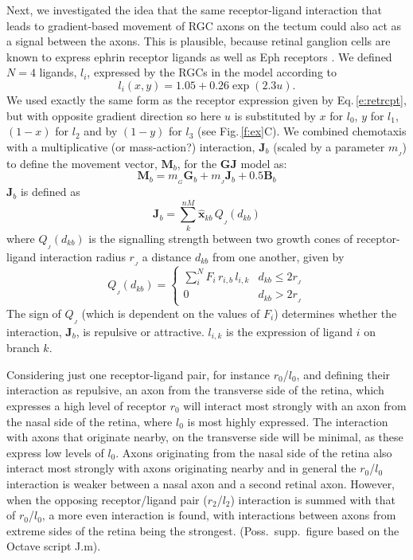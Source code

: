 \documentclass[11pt, a4paper]{article}
\begin{document}
Next, we investigated the idea that the same receptor-ligand
interaction that leads to gradient-based movement of RGC axons on the tectum
could also act as a signal between the axons. This is plausible, because
retinal ganglion cells are known to express ephrin receptor ligands as well as
Eph receptors \citep{ephrins_on_RGCs}. We defined $N=4$ ligands, $l_i$,
expressed by the RGCs in the model according to
%
\begin{equation} \label{e:retlig}
l_i(x,y) = 1.05 + 0.26 \exp(2.3 u).
\end{equation}
%
We used exactly the same form as the receptor expression given by
Eq.\,\ref{e:retrcpt}, but with opposite gradient direction so here $u$ is
substituted by $x$ for $l_0$, $y$ for $l_1$, $(1-x)$ for $l_2$ and by $(1-y)$
for $l_3$ (see Fig.\,\ref{f:ex}C).
%
We combined chemotaxis with a multiplicative (or mass-action?) interaction,
$\mathbf{J}_b$ (scaled by a parameter $m_{\!_J}$) to define the movement
vector, $\mathbf{M}_b$, for the $\mathbf{GJ}$ model as:
%
\begin{equation} \label{e:mv3}
 \mathbf{M}_{b} = m_{\!_G} \mathbf{G}_b + m_{\!_J} \mathbf{J}_b + 0.5 \mathbf{B}_b
\end{equation}
%
$\mathbf{J}_b$ is defined as
%
\begin{equation}
\mathbf{J}_b = \sum_k^{nM} \hat{\mathbf{x}}_{kb}\,Q_{\!_J}(d_{kb})
\end{equation}
%
where $Q_{\!_J}(d_{kb})$ is the signalling strength between two growth cones of
receptor-ligand interaction radius $r_{\!_J}$ a distance $d_{kb}$ from one another,
given by
%
\begin{equation}
Q_{\!_J}(d_{kb}) = \begin{cases}
     \sum_i^N F_i\,r_{i,b}\,l_{i,k}    & d_{kb} \leq 2r_{\!_J} \\
     0 & d_{kb} > 2r_{\!_J}
     \end{cases}
\end{equation}
%
The sign of $Q_{\!_J}$ (which is dependent on the values of $F_i$) determines
whether the interaction, $\mathbf{J}_b$, is repulsive or attractive. $l_{i,k}$
is the expression of ligand $i$ on branch $k$.

Considering just one receptor-ligand pair, for instance $r_0$/$l_0$, and
defining their interaction as repulsive, an axon from the transverse side of
the retina, which expresses a high level of receptor $r_0$ will interact most
strongly with an axon from the nasal side of the retina, where $l_0$ is most
highly expressed. The interaction with axons that originate nearby, on the
transverse side will be minimal, as these express low levels of $l_0$. Axons
originating from the nasal side of the retina also interact most strongly with
axons originating nearby and in general the $r_0$/$l_0$ interaction is weaker
between a nasal axon and a second retinal axon. However, when the opposing
receptor/ligand pair ($r_2$/$l_2$) interaction is summed with that of
$r_0$/$l_0$, a more even interaction is found, with interactions between axons
from extreme sides of the retina being the strongest. (Poss.~supp.~figure
based on the Octave script J.m).
\end{document}
